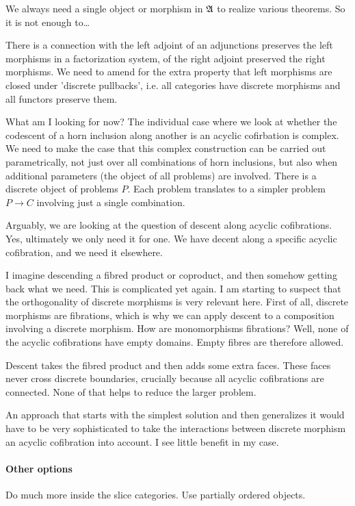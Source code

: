 \documentclass[csh.tex]{subfiles}
\begin{document}
We always need a single object or morphism in $\mathfrak A$ to realize various theorems. So it is not enough to\dots

There is a connection with the left adjoint of an adjunctions preserves the left morphisms in a factorization system, of the right adjoint preserved the right morphisms. We need to amend for the extra property that left morphisms are closed under 'discrete pullbacks', i.e. all categories have discrete morphisms and all functors preserve them.

What am I looking for now?
The individual case where we look at whether the codescent of a horn inclusion along another is an acyclic cofirbation is complex. We need to make the case that this complex construction can be carried out parametrically, not just over all combinations of horn inclusions, but also when additional parameters (the object of all problems) are involved.
There is a discrete object of problems $P$. Each problem translates to a simpler problem $P \to C$ involving just a single combination.

Arguably, we are looking at the question of descent along acyclic cofibrations. Yes, ultimately we only need it for one. We have decent along a specific acyclic cofibration, and we need it elsewhere.

I imagine descending a fibred product or coproduct, and then somehow getting back what we need. This is complicated yet again.
I am starting to suspect that the orthogonality of discrete morphisms is very relevant here. First of all, discrete morphisms are fibrations, which is why we can apply descent to a composition involving a discrete morphism. How are monomorphisms fibrations? Well, none of the acyclic cofibrations have empty domains. Empty fibres are therefore allowed.

Descent takes the fibred product and then adds some extra faces. These faces never cross discrete boundaries, crucially because all acyclic cofibrations are connected. None of that helps to reduce the larger problem.

An approach that starts with the simplest solution and then generalizes it would have to be very sophisticated to take the interactions between discrete morphism an acyclic cofibration into account. I see little benefit in my case.

\paragraph{Other options}
Do much more inside the slice categories.
Use partially ordered objects.
\end{document}
